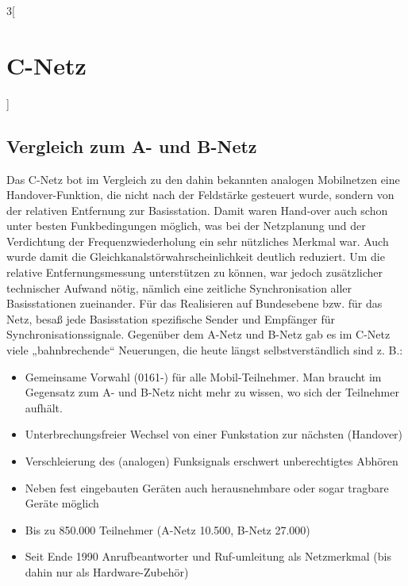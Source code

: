 \begin{multicols}{3}[\section{C-Netz}]
\subsection*{Vergleich zum A- und B-Netz}
Das C-Netz bot im Vergleich zu den dahin bekannten analogen Mobilnetzen eine Handover-Funktion, die nicht nach der Feldstärke gesteuert wurde, sondern von der relativen Entfernung zur Basisstation. Damit waren Hand-over auch schon unter besten Funkbedingungen möglich, was bei der Netzplanung und der Verdichtung der Frequenzwiederholung ein sehr nützliches Merkmal war. Auch wurde damit die Gleichkanalstörwahrscheinlichkeit deutlich reduziert. Um die relative Entfernungsmessung unterstützen zu können, war jedoch zusätzlicher technischer Aufwand nötig, nämlich eine zeitliche Synchronisation aller Basisstationen zueinander. Für das Realisieren auf Bundesebene bzw. für das Netz, besaß jede Basisstation spezifische Sender und Empfänger für Synchronisationssignale.
Gegenüber dem A-Netz und B-Netz gab es im C-Netz viele „bahnbrechende“ Neuerungen, die heute längst selbstverständlich sind z. B.:
\begin{itemize}
	\item Gemeinsame Vorwahl (0161-) für alle Mobil-Teilnehmer. Man braucht im Gegensatz zum A- und B-Netz nicht mehr zu wissen, wo sich der Teilnehmer aufhält.
	\item Unterbrechungsfreier Wechsel von einer Funkstation zur nächsten (Handover)
	\item Verschleierung des (analogen) Funksignals erschwert unberechtigtes Abhören
	\item Neben fest eingebauten Geräten auch herausnehmbare oder sogar tragbare Geräte möglich
	\item Bis zu 850.000 Teilnehmer (A-Netz 10.500, B-Netz 27.000)
	\item Seit Ende 1990 Anrufbeantworter und Ruf-umleitung als Netzmerkmal (bis dahin nur als Hardware-Zubehör)~\cite{c-netz.3}
\end{itemize}


\end{multicols}
